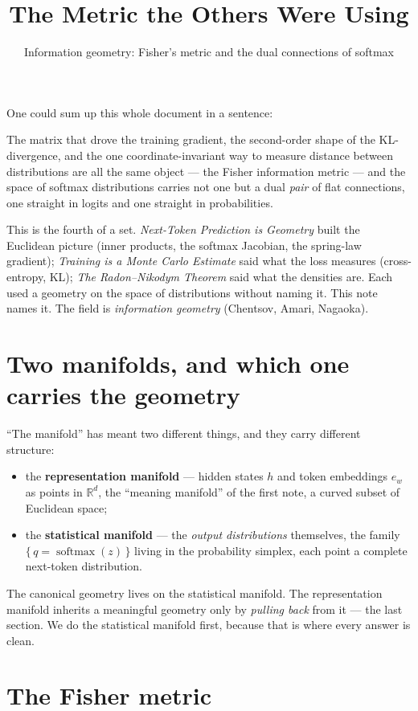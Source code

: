 \documentclass[11pt]{article}
\title{\color{inkblue}\bfseries The Metric the Others Were Using}
\author{Information geometry: Fisher's metric and the dual connections of softmax}
\date{}
\begin{document}
\maketitle
\thispagestyle{empty}

One could sum up this whole document in a sentence:
\begin{summary}
The matrix that drove the training gradient, the second-order shape of the KL-divergence, and
the one coordinate-invariant way to measure distance between distributions are all the same
object --- the Fisher information metric --- and the space of softmax distributions carries
not one but a dual \emph{pair} of flat connections, one straight in logits and one straight in
probabilities.
\end{summary}
This is the fourth of a set. \emph{Next-Token Prediction is Geometry} built the Euclidean
picture (inner products, the softmax Jacobian, the spring-law gradient); \emph{Training is a
Monte Carlo Estimate} said what the loss measures (cross-entropy, KL); \emph{The
Radon--Nikodym Theorem} said what the densities are. Each used a geometry on the space of
distributions without naming it. This note names it. The field is \emph{information geometry}
(Chentsov, Amari, Nagaoka).

\section{Two manifolds, and which one carries the geometry}

``The manifold'' has meant two different things, and they carry different structure:
\begin{itemize}[leftmargin=1.4em]
  \item the \textbf{representation manifold} --- hidden states $h$ and token embeddings $e_w$
  as points in $\mathbb{R}^d$, the ``meaning manifold'' of the first note, a curved subset of
  Euclidean space;
  \item the \textbf{statistical manifold} --- the \emph{output distributions} themselves, the
  family $\{\, q = \operatorname{softmax}(z) \,\}$ living in the probability simplex, each point
  a complete next-token distribution.
\end{itemize}
The canonical geometry lives on the statistical manifold. The representation manifold inherits
a meaningful geometry only by \emph{pulling back} from it --- the last section. We do the
statistical manifold first, because that is where every answer is clean.

\section{The Fisher metric}
\end{document}
